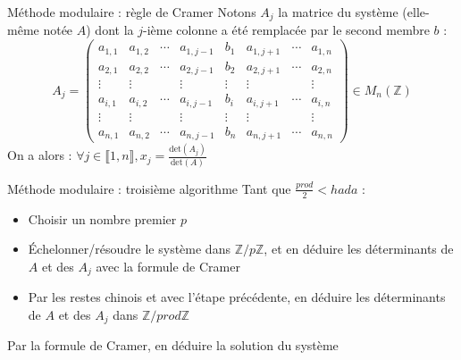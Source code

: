 \documentclass[11pt]{beamer}
\begin{document}
	\begin{frame}{Méthode modulaire : règle de Cramer}
		Notons $A_j$ la matrice du système (elle-même notée $A$) dont la $j$-ième colonne a été remplacée par le second membre $b$ :
		\begin{equation*}
			A_j = 
			\begin{pmatrix}
				a_{1,1} & a_{1,2} & \cdots & a_{1,j-1} & b_1 & a_{1,j+1} & \cdots & a_{1,n}\\
				a_{2,1} & a_{2,2} & \cdots & a_{2,j-1} & b_2 & a_{2,j+1} & \cdots & a_{2,n}\\
				\vdots  & \vdots  & & \vdots & \vdots & \vdots & & \vdots\\
				a_{i,1} & a_{i,2} & \cdots & a_{i,j-1} & b_i & a_{i,j+1} & \cdots & a_{i,n}\\
				\vdots  & \vdots  & & \vdots & \vdots & \vdots & & \vdots\\
				a_{n,1} & a_{n,2} & \cdots & a_{n,j-1} & b_n & a_{n,j+1} &\cdots & a_{n,n}
			\end{pmatrix}
			\in M_n(\mathbb{Z})
		\end{equation*}
		\newline
		On a alors : $ \forall j \in \llbracket1,n\rrbracket, x_j = \frac{\mbox{det}(A_j)}{\mbox{det}(A)}$
	\end{frame}
	
	\begin{frame}{Méthode modulaire : troisième algorithme}
		Tant que $\frac{prod}{2} < hada$ :
		\begin{itemize}
			\item Choisir un nombre premier $p$
			\item Échelonner/résoudre le système dans $\mathbb{Z}/p\mathbb{Z}$, et en déduire les déterminants de $A$ et des $A_j$ avec la formule de Cramer
			\item Par les restes chinois et avec l'étape précédente, en déduire les déterminants de $A$ et des $A_j$ dans $\mathbb{Z}/prod\mathbb{Z}$
		\end{itemize}
		Par la formule de Cramer, en déduire la solution du système
	\end{frame}
	
\end{document}

